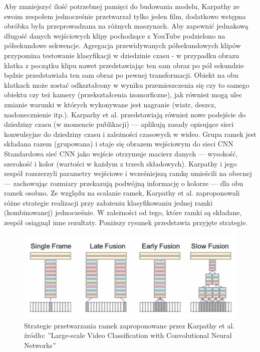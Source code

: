 Aby zmniejszyć ilość potrzebnej pamięci do budowania modelu, Karpathy ze swoim zespołem jednocześnie przetwarzał tylko jeden film, dodatkowo wstępna obróbka była przeprowadzana na różnych maszynach. Aby zapewnić jednakową długość danych wejściowych klipy pochodzące z YouTube podzielono na półsekundowe sekwencje. Agregacja przewidywanych półsekundowych klipów przypomina testowanie klasyfikacji w dziedzinie czasu - w przypadku obrazu  klatka z początku klipu nawet przedstawiając ten sam obraz po pół sekundzie będzie przedstawiała ten sam obraz po pewnej transformacji. Obiekt na obu klatkach może zostać odkształcony w wyniku przemieszczenia się czy to samego obiektu czy też kamery (przekształcenia izomorficzne), jak również mogą ulec zmianie warunki w których wykonywane jest nagranie (wiatr, deszcz, nasłonecznienie itp.).
Karparhy et al. przedstawiają również nowe podejście do dziedziny czasu (w momencie publikacji) --- aplikują zasady opisujące sieci konwulsyjne do dziedziny czasu i zależności czasowych w wideo. Grupa ramek jest składana razem (grupowana) i staje się obrazem wejściowym do sieci CNN %
Standardowa sieć CNN jako wejście otrzymuje macierz danych --- wysokość, szerokość i kolor (wartości w każdym z trzech składowych). Karpathy i jego zespół rozszerzyli parametry wejściowe i wcześniejszą ramkę umieścili na obecnej --- zachowując rozmiary przekazują podwójną informację o kolorze --- dla obu ramek osobno. Ze względu na scalanie ramek, Karpathy et al. zaproponowali różne strategie realizacji przy założeniu klasyfikowaniu jednej ramki (kombinowanej) jednocześnie. W zależności od tego, które ramki są składane, zespół osiągnął inne rezultaty. Poniższy rysunek przedstawia przyjęte strategie.\\
\begin{figure}[ht]
    \centering
    \includegraphics[width=\textwidth]{fig/karpathy1.pdf}
    \caption{Strategie przetwarzania ramek zaproponowane przez Karpathy et al. źródło: ''Large-scale Video Classification with Convolutional Neural Networks''}
    \label{fig:karpathy1}
\end{figure}
